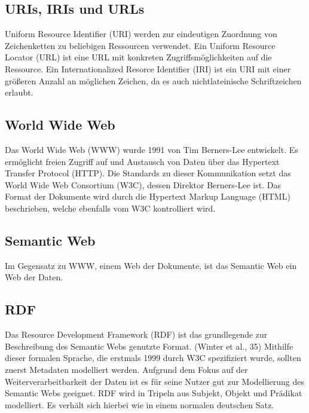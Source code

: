 \subsection{URIs, IRIs und URLs}
Uniform Resource Identifier (URI) werden zur eindeutigen Zuordnung von Zeichenketten zu beliebigen Ressourcen verwendet.
Ein Uniform Resource Locator (URL) ist eine URL mit konkreten Zugriffsmöglichkeiten auf die Ressource.
Ein Internationalized Resorce Identifier (IRI) ist ein URI mit einer größeren Anzahl an möglichen Zeichen, da es auch nichtlateinische Schriftzeichen erlaubt.

\subsection{World Wide Web}
Das World Wide Web (WWW) wurde 1991 von Tim Berners-Lee entwickelt.
Es ermöglicht freien Zugriff auf und Austausch von Daten über das Hypertext Transfer Protocol (HTTP).
Die Standards zu dieser Kommunikation setzt das World Wide Web Consortium (W3C), dessen Direktor Berners-Lee ist.
Das Format der Dokumente wird durch die Hypertext Markup Language (HTML) beschrieben, welche ebenfalls vom W3C kontrolliert wird.

\subsection{Semantic Web}
Im Gegensatz zu WWW, einem Web der Dokumente, ist das Semantic Web ein Web der Daten.

\subsection{RDF}
Das Resource Development Framework (RDF) ist das grundlegende zur Beschreibung des Semantic Webs genutzte Format. (Winter et al., 35)
Mithilfe dieser formalen Sprache, die erstmals 1999 durch W3C spezifiziert wurde, sollten zuerst Metadaten modelliert werden.
Aufgrund dem Fokus auf der Weiterverarbeitbarkeit der Daten ist es für seine Nutzer gut zur Modellierung des Semantic Webs geeignet.
RDF wird in Tripeln aus Subjekt, Objekt und Prädikat modelliert. Es verhält sich hierbei wie in einem normalen deutschen Satz.

